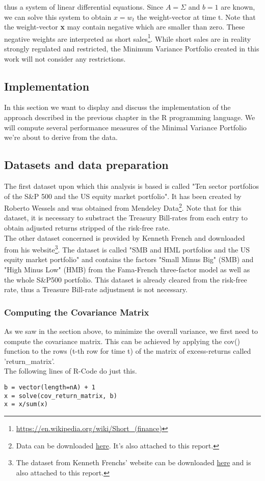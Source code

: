thus a system of linear differential equations. Since $A = \Sigma$ and $b = 1$ are known, we can solve this system to obtain $x = w_t$ the weight-vector at time t. Note that the weight-vector \textbf{x} may contain negative which are smaller than zero. These negative weights are interpreted as short sales\footnote{\url{https://en.wikipedia.org/wiki/Short_(finance)}}. While short sales are in reality strongly regulated and restricted, the Minimum Variance Portfolio created in this work will not consider any restrictions.

\subsection{Implementation}
In this section we want to display and discuss the implementation of the approach described in the previous chapter in the R programming language. We will compute several performance measures of the Minimal Variance Portfolio we're about to derive from the data.

\subsection{Datasets and data preparation}
The first dataset upon which this analysis is based is called "Ten sector portfolios of the S\&P 500 and the US equity market portfolio". It has been created by Roberto Wessels and was obtained from Mendeley Data\footnote{Data can be downloaded \href{https://data.mendeley.com/datasets/ndxfrshm74/3}{here}. It's also attached to this report.}. Note that for this dataset, it is necessary to substract the Treasury Bill-rates from each entry to obtain adjusted returns stripped of the risk-free rate.\\

The other dataset concerned is provided by Kenneth French and downloaded from his website\footnote{The dataset from Kenneth Frenchs' website can be downloaded \href{http://mba.tuck.dartmouth.edu/pages/faculty/ken.french/ftp/F-F_Research_Data_Factors_CSV.zip}{here} and is also attached to this report.}. The dataset is called "SMB and HML portfolios and the US equity market portfolio" and contains the factors "Small Minus Big" (SMB) and "High Minus Low" (HMB) from the Fama-French three-factor model as well as the whole S\&P500 portfolio. This dataset is already cleared from the risk-free rate, thus a Treasure Bill-rate adjustment is not necessary.

\subsubsection{Computing the Covariance Matrix}
As we saw in the section above, to minimize the overall variance, we first need to compute the covariance matrix. This can be achieved by applying the cov() function to the rows (t-th row for time t) of the matrix of excess-returns called 'return\_matrix'.\\
The following lines of R-Code do just this.
\begin{lstlisting}[frame=single]
b = vector(length=nA) + 1
x = solve(cov_return_matrix, b)
x = x/sum(x)
\end{lstlisting}

